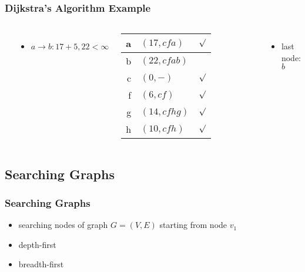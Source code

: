 \documentclass[dvipsnames]{beamer}
\begin{document}
\begin{frame}
  \frametitle{Dijkstra's Algorithm Example}

  \begin{example}[from node $a$ - base distance=$17$]
    \begin{columns}
      \begin{center}
      \end{center}

      \begin{itemize}
        \item $a \rightarrow b: 17+5, 22 < \infty$
      \end{itemize}

      \pause
      \begin{table}
        \begin{tabular}{r|l|c}
          a & $(17,cfa)$   & $\surd$ \\\hline
          b & $(22,cfab)$  & \\\hline
          c & $(0,-)$      & $\surd$ \\\hline
          f & $(6,cf)$     & $\surd$ \\\hline
          g & $(14,cfhg)$  & $\surd$ \\\hline
          h & $(10,cfh)$   & $\surd$
        \end{tabular}
      \end{table}

      \pause
      \begin{itemize}
        \item last node: $b$
      \end{itemize}
    \end{columns}
  \end{example}
\end{frame}

\subsection{Searching Graphs}

\begin{frame}
  \frametitle{Searching Graphs}

  \begin{itemize}
    \item searching nodes of graph $G=(V,E)$ starting from node $v_1$

    \bigskip
    \item depth-first
    \item breadth-first
  \end{itemize}
\end{frame}
\end{document}

